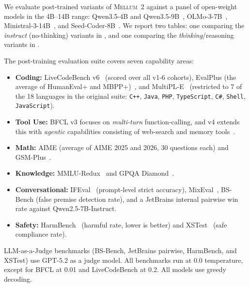 \documentclass{llmxive}
\providecommand{\modelname}{\textsc{Mellum~2}\xspace}
\begin{document}
We evaluate post-trained variants of \modelname against a panel of open-weight
models in the 4B--14B range: Qwen3.5-4B and Qwen3.5-9B~\cite{yang2025qwen3},
OLMo-3-7B~\cite{olmo3}, Ministral-3-14B~\cite{liu2026ministral3}, and
Seed-Coder-8B~\cite{zhang2025seedcoder}. We report two tables: one comparing
the \emph{instruct} (no-thinking) variants in ,
and one comparing the \emph{thinking}/reasoning variants in
. 

The post-training evaluation suite covers seven capability areas:
\begin{itemize}
  \item \textbf{Coding:} 
    LiveCodeBench v6~\cite{jain2024livecodebench} (scored over all v1-6 cohorts), 
    EvalPlus (the average of HumanEval+ and MBPP+)~\cite{liu2023evalplus}, and
    MultiPL-E~\cite{cassano2022multipl} (restricted to 7 of the 18 languages
in the original suite: \texttt{C++}, \texttt{Java}, \texttt{PHP},
\texttt{TypeScript}, \texttt{C\#}, \texttt{Shell}, \texttt{JavaScript}).
  \item \textbf{Tool Use:} BFCL v3 focuses on \textit{multi-turn} function-calling, and v4 extends this with \textit{agentic} capabilities consisting of web-search and memory tools~\cite{patil2025bfcl}.
  \item \textbf{Math:} AIME (average of AIME 2025 and 2026, 30
    questions each) and GSM-Plus~\cite{li2024gsmplus}.
  \item \textbf{Knowledge:} MMLU-Redux~\cite{gema2024mmluredux} and
    GPQA Diamond~\cite{rein2023gpqa}.
  \item \textbf{Conversational:} 
    IFEval~\cite{zhou2023ifeval} (prompt-level strict accuracy),
    MixEval~\cite{ni2024mixeval}, BS-Bench (false premise detection rate), 
    and a JetBrains internal pairwise win rate against Qwen2.5-7B-Instruct.
  \item \textbf{Safety:} HarmBench~\cite{mazeika2024harmbench} (harmful rate, lower is
    better) and XSTest~\cite{rottger2024xstest} (safe compliance rate).
\end{itemize}

LLM-as-a-Judge benchmarks (BS-Bench, JetBrains pairwise, HarmBench, and XSTest) use GPT-5.2 as a judge model. 
All benchmarks run at 0.0 temperature, except for BFCL at 0.01 and LiveCodeBench at 0.2.
All models use greedy decoding.
\end{document}
